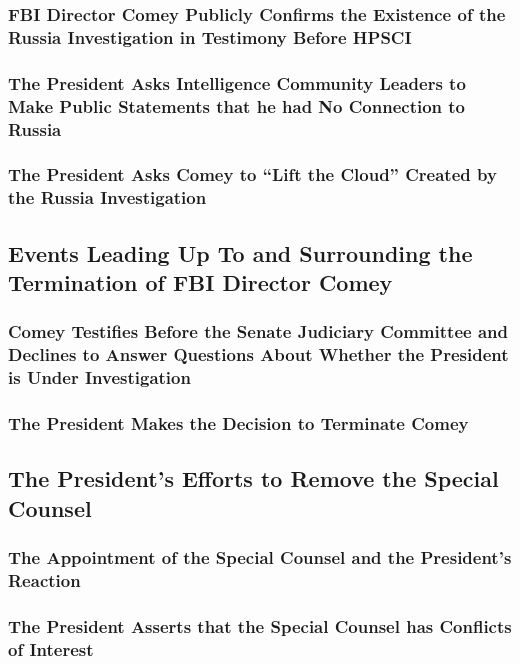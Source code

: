 \subsubsection{FBI Director Comey Publicly Confirms the Existence of the Russia Investigation in Testimony Before HPSCI}

\subsubsection{The President Asks Intelligence Community Leaders to Make Public Statements that he had No Connection to Russia}

\subsubsection{The President Asks Comey to “Lift the Cloud” Created by the Russia Investigation}

\subsection{Events Leading Up To and Surrounding the Termination of FBI Director Comey}

\subsubsection{Comey Testifies Before the Senate Judiciary Committee and Declines to Answer Questions About Whether the President is Under Investigation}

\subsubsection{The President Makes the Decision to Terminate Comey}

\subsection{The President's Efforts to Remove the Special Counsel}

\subsubsection{The Appointment of the Special Counsel and the President's Reaction}

\subsubsection{The President Asserts that the Special Counsel has Conflicts of Interest}


